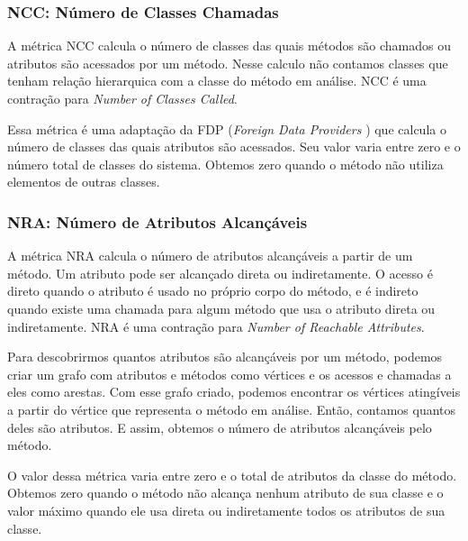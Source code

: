 	
	
\subsubsection{NCC: Número de Classes Chamadas}              
                                                                 
   	A métrica NCC calcula o número de classes das quais métodos são chamados ou atributos são acessados por um método. Nesse calculo não contamos classes que tenham relação hierarquica  com a classe do método em análise. NCC é uma contração para \textit{Number of Classes Called}.

	Essa métrica é uma adaptação da FDP (\textit{Foreign Data Providers} \citep{Lanza06}) que calcula o número de classes das quais atributos são acessados. Seu valor varia entre zero e o número total de classes do sistema. Obtemos zero quando o método não utiliza elementos de outras classes.

	
	
\subsubsection{NRA: Número de Atributos Alcançáveis}
                                           
	A métrica NRA calcula o número de atributos alcançáveis a partir de um método. Um atributo pode ser alcançado direta ou indiretamente. O acesso é direto quando o atributo é usado no próprio corpo do método, e é indireto quando existe uma chamada para algum método que usa o atributo direta ou indiretamente. NRA é uma contração para \textit{Number of Reachable Attributes}.
	          
	Para descobrirmos quantos atributos são alcançáveis por um método, podemos criar um grafo com atributos e métodos como vértices e os acessos e chamadas a eles como arestas. Com esse grafo criado, podemos encontrar os vértices atingíveis a partir do vértice que representa o método em análise. Então, contamos quantos deles são atributos. E assim, obtemos o número de atributos alcançáveis pelo método.
                                                           
	O valor dessa métrica varia entre zero e o total de atributos da classe do método. Obtemos zero quando o método não alcança nenhum atributo de sua classe e o valor máximo quando ele usa direta ou indiretamente todos os atributos de sua classe.
                          


